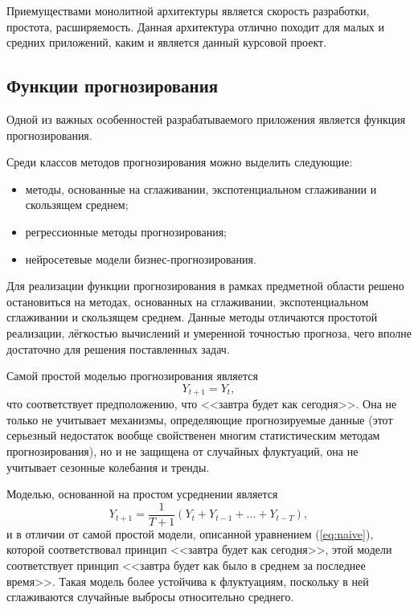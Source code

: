 Приемуществами монолитной архитектуры является скорость разработки, простота, расширяемость. Данная 
архитектура отлично походит для малых и средних приложений, каким и является данный курсовой проект.

\subsection{Функции прогнозирования}
\label{sec:prediction}

Одной из важных особенностей разрабатываемого приложения является функция прогнозирования.

Среди классов методов прогнозирования можно выделить следующие:
\begin{itemize}
  \item методы, основанные на сглаживании, экспотенциальном сглаживании и скользящем среднем;
  \item регрессионные методы прогнозирования;
  \item нейросетевые модели бизнес-прогнозирования.
\end{itemize}

Для реализации функции прогнозирования в рамках предметной области решено остановиться на методах, 
основанных на сглаживании, экспотенциальном сглаживании и скользящем среднем. Данные методы отличаются 
простотой реализации, лёгкостью вычислений и умеренной точностью прогноза, чего вполне достаточно для 
решения поставленных задач.

Самой простой моделью прогнозирования является
\begin{equation} 
Y_{t+1}=Y_t, \label{eq:naive}
\end{equation}
что соответствует предположению, что <<завтра будет как сегодня>>. Она не только не учитывает механизмы, 
определяющие прогнозируемые данные (этот серьезный недостаток вообще свойственен многим статистическим 
методам прогнозирования), но и не защищена от случайных флуктуаций, она не учитывает сезонные колебания и тренды.

Моделью, основанной на простом усреднении является
\begin{equation} 
Y_{t+1}=\frac{1}{T+1}(Y_t+Y_{t-1}+...+Y_{t-T}), \label{eq:avg}
\end{equation}
и в отличии от самой простой модели, описанной уравнением (\ref{eq:naive}), которой соответствовал принцип 
<<завтра будет как сегодня>>, этой модели соответствует принцип <<завтра будет как было в среднем за последнее время>>. 
Такая модель  более устойчива к флуктуациям, поскольку в ней сглаживаются случайные выбросы относительно среднего.

